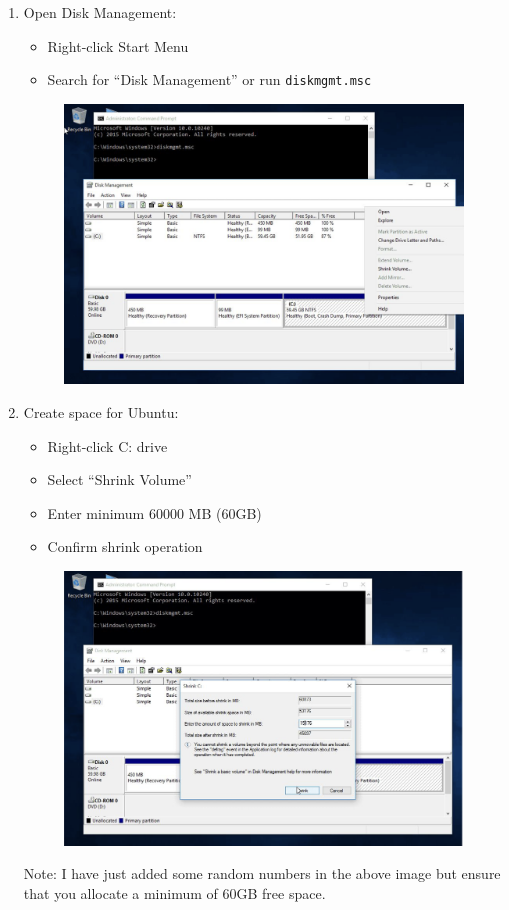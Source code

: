 \documentclass[11pt,a4paper]{article}
\begin{document}
\begin{enumerate}
    \item Open Disk Management:
    \begin{itemize}
        \item Right-click Start Menu
        \item Search for ``Disk Management'' or run \texttt{diskmgmt.msc}
    \end{itemize}
    \begin{figure}[htp]
        \centering
        \includegraphics[width=0.6\linewidth]{images/step1.png}
        \label{fig:enter-label}
    \end{figure}
    \item Create space for Ubuntu:
    \begin{itemize}
        \item Right-click C: drive
        \item Select ``Shrink Volume''
        \item Enter minimum 60000 MB (60GB)
        \item Confirm shrink operation
    \end{itemize}
    \begin{figure}[htp]
        \centering
        \includegraphics[width=0.6\linewidth]{images/step2.png}
        \label{fig:enter-label}
    \end{figure}
    Note: I have just added some random numbers in the above image but ensure that you allocate a minimum of 60GB free space.

\end{enumerate}
\end{document}
